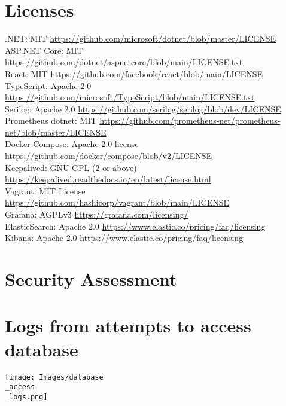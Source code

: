 \appendix
\section{Licenses} \label{ssec:licences}
.NET: MIT \url{https://github.com/microsoft/dotnet/blob/master/LICENSE} \\
ASP.NET Core: MIT \url{https://github.com/dotnet/aspnetcore/blob/main/LICENSE.txt} \\
React: MIT \url{https://github.com/facebook/react/blob/main/LICENSE} \\
TypeScript: Apache 2.0 \url{https://github.com/microsoft/TypeScript/blob/main/LICENSE.txt} \\
Serilog: Apache 2.0 \url{https://github.com/serilog/serilog/blob/dev/LICENSE} \\
Prometheus dotnet: MIT \url{https://github.com/prometheus-net/prometheus-net/blob/master/LICENSE} \\
Docker-Compose: Apache-2.0 license \url{https://github.com/docker/compose/blob/v2/LICENSE} \\
Keepalived: GNU GPL (2 or above) \url{https://keepalived.readthedocs.io/en/latest/license.html} \\
Vagrant: MIT License \url{https://github.com/hashicorp/vagrant/blob/main/LICENSE} \\
Grafana: AGPLv3 \url{https://grafana.com/licensing/} \\
ElasticSearch: Apache 2.0 \url{https://www.elastic.co/pricing/faq/licensing} \\
Kibana: Apache 2.0 \url{https://www.elastic.co/pricing/faq/licensing} \\

\section{Security Assessment}\label{app:SecurityAssessment}


\section{Logs from attempts to access database}
\begin{center}
    \texttt{[image: Images/database\\\_access\\\_logs.png]}
\end{center}